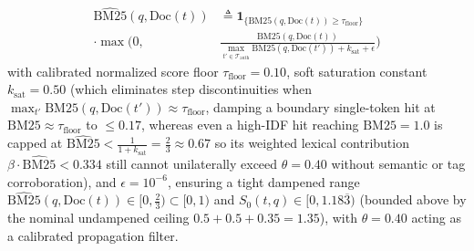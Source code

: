 \documentclass[conference,10pt]{IEEEtran}
\begin{document}
\begin{equation}
\label{eq:bm25}
\begin{aligned}
\widehat{\mathrm{BM25}}(q, \text{Doc}(t)) &\triangleq \mathbf{1}_{\{\text{BM25}(q, \text{Doc}(t)) \ge \tau_{\text{floor}}\}} \\
\cdot \max\Biggl(0, &\frac{\text{BM25}(q, \text{Doc}(t))}{\max_{t' \in \mathcal{T}_{\text{auth}}} \text{BM25}(q, \text{Doc}(t')) + k_{\text{sat}} + \epsilon}\Biggr)
\end{aligned}
\end{equation}
with calibrated normalized score floor $\tau_{\text{floor}} = 0.10$, soft saturation constant $k_{\text{sat}} = 0.50$ (which eliminates step discontinuities when $\max_{t'} \text{BM25}(q, \text{Doc}(t')) \approx \tau_{\text{floor}}$, damping a boundary single-token hit at $\text{BM25} \approx \tau_{\text{floor}}$ to $\le 0.17$, whereas even a high-IDF hit reaching $\text{BM25} = 1.0$ is capped at \mbox{$\widehat{\mathrm{BM25}} < \frac{1}{1 + k_{\text{sat}}} = \frac{2}{3} \approx 0.67$} so its weighted lexical contribution \mbox{$\beta \cdot \widehat{\mathrm{BM25}} < 0.334$} still cannot unilaterally exceed $\theta = 0.40$ without semantic or tag corroboration), and $\epsilon = 10^{-6}$, ensuring a tight dampened range \mbox{$\widehat{\mathrm{BM25}}(q, \text{Doc}(t)) \in [0, \frac{2}{3}) \subset [0, 1)$} and $S_0(t, q) \in [0, 1.18\overline{3})$ (bounded above by the nominal undampened ceiling $0.5 + 0.5 + 0.35 = 1.35$), with $\theta = 0.40$ acting as a calibrated propagation filter.
\end{document}
